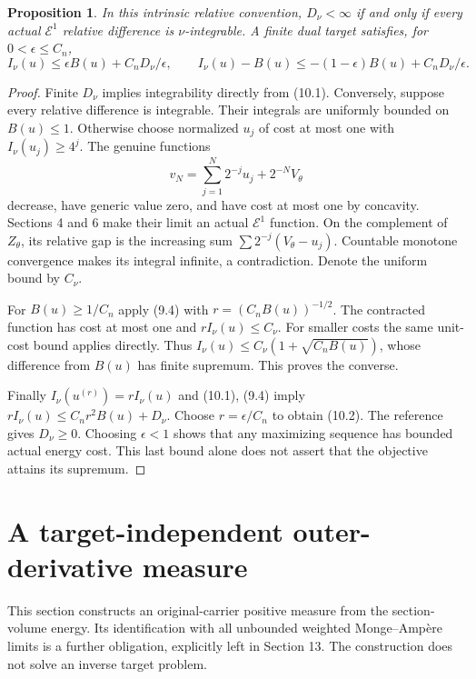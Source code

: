 \documentclass[10pt]{article}
\newtheorem{proposition}[theorem]{Proposition}
\newcommand{\E}{\mathcal E}
\begin{document}
\begin{proposition}
In this intrinsic relative convention, $D_\nu<\infty$ if and only if
every actual $\E^1$ relative difference is $\nu$-integrable. A finite dual
target satisfies, for $0<\epsilon\leq C_n$,
\[
 I_\nu(u)\leq\epsilon B(u)+C_nD_\nu/\epsilon,\qquad
 I_\nu(u)-B(u)\leq-(1-\epsilon)B(u)+C_nD_\nu/\epsilon. \tag{10.2}
\]
\end{proposition}
\begin{proof}
Finite $D_\nu$ implies integrability directly from (10.1). Conversely,
suppose every relative difference is integrable. Their integrals are
uniformly bounded on $B(u)\leq1$. Otherwise choose normalized $u_j$ of
cost at most one with $I_\nu(u_j)\geq4^j$. The genuine functions
\[
 v_N=\sum_{j=1}^N2^{-j}u_j+2^{-N}V_\theta
\]
decrease, have generic value zero, and have cost at most one by concavity.
Sections 4 and 6 make their limit an actual $\E^1$ function. On the
complement of $Z_\theta$, its relative gap is the increasing sum
$\sum2^{-j}(V_\theta-u_j)$. Countable monotone convergence makes its
integral infinite, a contradiction. Denote the uniform bound by $C_\nu$.

For $B(u)\geq1/C_n$ apply (9.4) with
$r=(C_nB(u))^{-1/2}$. The contracted function has cost at most one and
$rI_\nu(u)\leq C_\nu$. For smaller costs the same unit-cost bound applies
directly. Thus $I_\nu(u)\leq C_\nu(1+\sqrt{C_nB(u)})$, whose difference
from $B(u)$ has finite supremum. This proves the converse.

Finally $I_\nu(u^{(r)})=rI_\nu(u)$ and (10.1), (9.4) imply
$rI_\nu(u)\leq C_nr^2B(u)+D_\nu$. Choose $r=\epsilon/C_n$ to obtain
(10.2). The reference gives $D_\nu\geq0$. Choosing $\epsilon<1$ shows
that any maximizing sequence has bounded actual energy cost. This last
bound alone does not assert that the objective attains its supremum.
\end{proof}

\section{A target-independent outer-derivative measure}
This section constructs an original-carrier positive measure from the
section-volume energy. Its identification with all unbounded weighted
Monge--Amp\`ere limits is a further obligation, explicitly left in
Section 13. The construction does not solve an inverse target problem.
\end{document}
